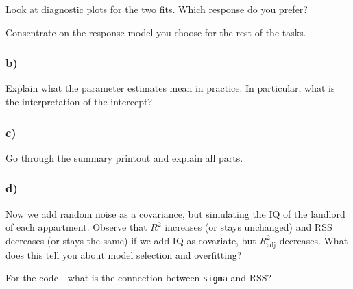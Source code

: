 \documentclass[]{article}
\begin{document}
Look at diagnostic plots for the two fits. Which response do you prefer?

Consentrate on the response-model you choose for the rest of the tasks.

\subsubsection{b)}\label{b-1}

Explain what the parameter estimates mean in practice. In particular,
what is the interpretation of the intercept?

\subsubsection{c)}\label{c-1}

Go through the summary printout and explain all parts.

\subsubsection{d)}\label{d-1}

Now we add random noise as a covariance, but simulating the IQ of the
landlord of each appartment. Observe that \(R^2\) increases (or stays
unchanged) and RSS decreases (or stays the same) if we add IQ as
covariate, but \(R^2_{\text{adj}}\) decreases. What does this tell you
about model selection and overfitting?

For the code - what is the connection between \texttt{sigma} and RSS?
\end{document}
